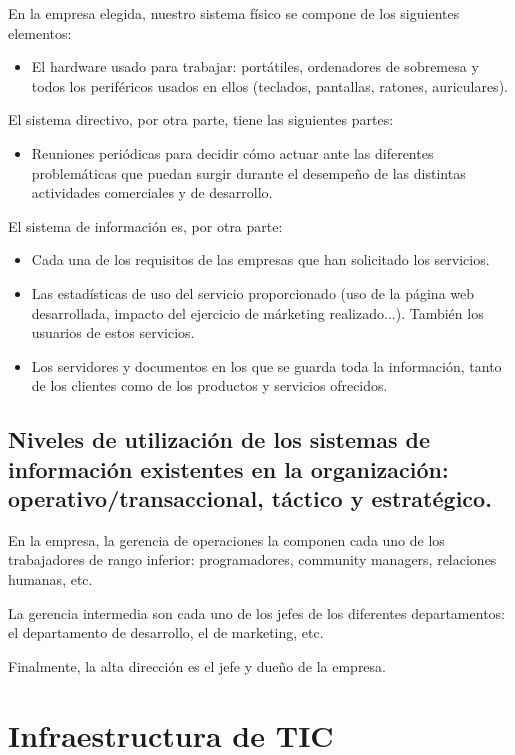 \documentclass{article}
\begin{document}
En la empresa elegida, nuestro sistema físico se compone de los siguientes elementos: 

\begin{itemize}
\item El hardware usado para trabajar:  portátiles, ordenadores de sobremesa y todos los periféricos usados en ellos (teclados, pantallas, ratones, auriculares). 
\end{itemize}

El sistema directivo, por otra parte, tiene las siguientes partes: 

\begin{itemize}
\item Reuniones periódicas para decidir cómo actuar ante las diferentes problemáticas que puedan surgir durante el desempeño de las distintas actividades comerciales y de desarrollo. 
\end{itemize}

El sistema de información es, por otra parte:

\begin{itemize}
\item Cada una de los requisitos de las empresas que han solicitado los servicios.
\item Las estadísticas de uso del servicio proporcionado (uso de la página web desarrollada, impacto del ejercicio de márketing realizado...). También los usuarios de estos servicios.
\item Los servidores y documentos en los que se guarda toda la información, tanto de los clientes como de los productos y servicios ofrecidos.
\end{itemize} 

\subsection{Niveles de utilización de los sistemas de información existentes en la organización: operativo/transaccional, táctico y estratégico.}

En la empresa, la gerencia de operaciones la componen cada uno de los trabajadores de rango inferior: programadores, community managers, relaciones humanas, etc.  

La gerencia intermedia son cada uno de los jefes de los diferentes departamentos: el departamento de desarrollo, el de marketing, etc. 

Finalmente, la alta dirección es el jefe y dueño de la empresa.

\section{Infraestructura de TIC}
\end{document}
